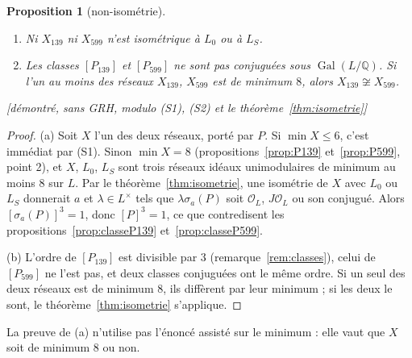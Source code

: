 \documentclass[11pt,a4paper]{amsart}
\theoremstyle{plain}
\newtheorem{proposition}[theoreme]{Proposition}
\theoremstyle{definition}
\numberwithin{equation}{section}
\newcommand{\Q}{\mathbb{Q}}
\newcommand{\OO}{\mathcal{O}}
\DeclareMathOperator{\Gal}{Gal}
\newcommand{\Lz}{L_{0}}
\newcommand{\LS}{L_{S}}
\newcommand{\st}[1]{\textup{\textsf{\small[#1]}}}
\begin{document}
\begin{proposition}[non-isométrie]\label{prop:noniso}
\begin{enumerate}[label=\textup{(\alph*)}]
\item Ni $X_{139}$ ni $X_{599}$ n'est isométrique à $\Lz$ ou à $\LS$.
\item Les classes $[P_{139}]$ et $[P_{599}]$ ne sont pas conjuguées sous $\Gal(L/\Q)$. Si l'un au moins des réseaux $X_{139}$, $X_{599}$ est de minimum $8$, alors $X_{139}\not\cong X_{599}$.
\end{enumerate}
\st{démontré, sans GRH, modulo (S1), (S2) et le théorème~\ref{thm:isometrie}}
\end{proposition}

\begin{proof}
(a) Soit $X$ l'un des deux réseaux, porté par $P$. Si $\min X\le6$, c'est immédiat par (S1). Sinon $\min X=8$ (propositions~\ref{prop:P139} et~\ref{prop:P599}, point 2), et $X$, $\Lz$, $\LS$ sont trois réseaux idéaux unimodulaires de minimum au moins $8$ sur $L$. Par le théorème~\ref{thm:isometrie}, une isométrie de $X$ avec $\Lz$ ou $\LS$ donnerait $a$ et $\lambda\in L^\times$ tels que $\lambda\sigma_a(P)$ soit $\OO_L$, $J\OO_L$ ou son conjugué. Alors $[\sigma_a(P)]^3=1$, donc $[P]^3=1$, ce que contredisent les propositions~\ref{prop:classeP139} et~\ref{prop:classeP599}.

(b) L'ordre de $[P_{139}]$ est divisible par $3$ (remarque~\ref{rem:classes}), celui de $[P_{599}]$ ne l'est pas, et deux classes conjuguées ont le même ordre. Si un seul des deux réseaux est de minimum $8$, ils diffèrent par leur minimum ; si les deux le sont, le théorème~\ref{thm:isometrie} s'applique.
\end{proof}

La preuve de (a) n'utilise pas l'énoncé assisté sur le minimum : elle vaut que $X$ soit de minimum $8$ ou non.
\end{document}
